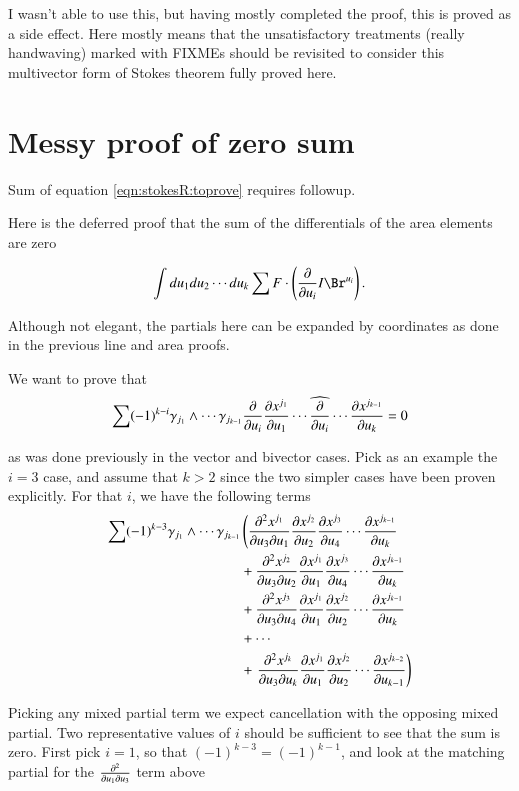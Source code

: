 I wasn't able to use this, but having mostly completed the proof, this is proved as a side effect.  Here mostly means that the
unsatisfactory treatments (really handwaving) marked with FIXMEs should be revisited to consider this multivector form of Stokes theorem fully proved here.

\section{Messy proof of zero sum}

Sum of equation \ref{eqn:stokesR:toprove} requires followup.

Here is the deferred proof that the sum of the differentials of the area elements are zero

\begin{align*}
\int du_1 du_2 \cdots du_k \sum F \cdot \left( \PD{u_i}{} I \Br^{u_i} \right).
\end{align*}

Although not elegant, the partials here can be expanded by coordinates as done in the previous line and area proofs.

We want to prove that 
\begin{equation}
\sum (-1)^{k-i} \gamma_{j_1} \wedge \cdots \gamma_{j_{k-1}} \PD{u_i}{}
\PD{u_1}{x^{j_1}} \cdots \widehat{\PD{u_i}{}} \cdots \PD{u_k}{x^{j_{k-1}}}
= 0
\end{equation}

as was done previously in the vector and bivector cases.  Pick as an example the $i=3$ case, and assume that $k > 2$ since
the two simpler cases have been proven explicitly.  For that $i$, we have the following terms
\begin{align*}
\sum (-1)^{k-3} \gamma_{j_1} \wedge \cdots \gamma_{j_{k-1}} 
&\left(\PDD{u_3}{u_1}{x^{j_1}} \PD{u_2}{x^{j_{2}}} \PD{u_4}{x^{j_3}} \cdots \PD{u_k}{x^{j_{k-1}}}\right. \\
&+\PDD{u_3}{u_2}{x^{j_2}} \PD{u_1}{x^{j_1}} \PD{u_4}{x^{j_3}} \cdots \PD{u_k}{x^{j_{k-1}}} \\
&+\PDD{u_3}{u_4}{x^{j_3}} \PD{u_1}{x^{j_1}} \PD{u_2}{x^{j_2}} \cdots \PD{u_k}{x^{j_{k-1}}} \\
&+\cdots \\
&+\left.\PDD{u_3}{u_k}{x^{j_k}} \PD{u_1}{x^{j_1}} \PD{u_2}{x^{j_2}} \cdots \PD{u_{k-1}}{x^{j_{k-2}}}\right)
\end{align*}

Picking any mixed partial term we expect cancellation with the opposing mixed partial.  Two representative values of $i$ should be sufficient to see that the sum
is zero.  First pick $i=1$, so that $(-1)^{k-3} = (-1)^{k-1}$, and look at the 
matching partial for the $\PDD{u_1}{u_3}{}$ term above

